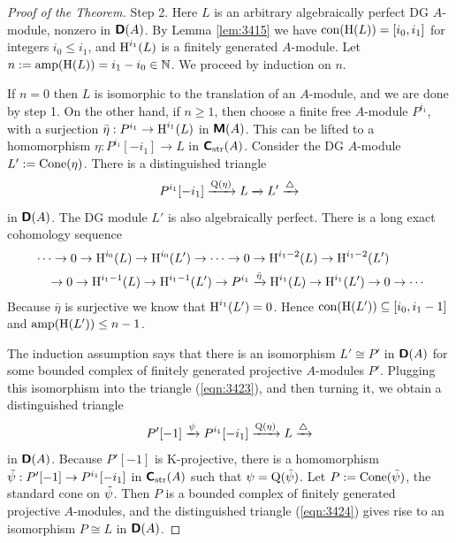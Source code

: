 \begin{proof}[Proof of the Theorem]
\medskip \noindent
Step 2. Here $L$ is an arbitrary algebraically perfect DG $A$-module, nonzero 
in $\boldsymbol{\mathsf{D}}(A)$. By Lemma \ref{lem:3415} we have 
$\operatorname{con}(\operatorname{H}(L)) = [i_0, i_1]$ for integers $i_0 \leq i_1$, and 
$\operatorname{H}^{i_1}(L)$ is a finitely generated $A$-module. 
Let $n := \operatorname{amp}(\operatorname{H}(L)) = i_1 - i_0 \in \mathbb{N}$.
We proceed by induction on $n$. 

If $n = 0$ then $L$ is isomorphic to the translation of an $A$-module, and we 
are done by step 1. On the other hand, if $n \geq 1$, then choose a finite free 
$A$-module $P^{i_1}$, with a surjection 
$\bar{\eta} : P^{i_1} \to \operatorname{H}^{i_1}(L)$ in $\boldsymbol{\mathsf{M}}(A)$. 
This can be lifted to a homomorphism 
$\eta : P^{i_1}[-i_1] \to L$ in $\boldsymbol{\mathsf{C}}_{\mathrm{str}}(A)$. 
Consider the DG $A$-module 
$L' := \operatorname{Cone}(\eta)$.
There is a distinguished triangle 
\begin{equation} \label{eqn:3423}
P^{i_1}[-i_1] \xrightarrow{\operatorname{Q}(\eta)} L \xrightarrow{} L' \xrightarrow{\triangle} 
\end{equation}
in $\boldsymbol{\mathsf{D}}(A)$. 
The DG module $L'$ is also algebraically perfect. There is a long exact 
cohomology sequence 
\[ \begin{aligned}
& \cdots \to 0 \to \operatorname{H}^{i_0}(L) \to \operatorname{H}^{i_0}(L') \to \cdots 
\to 0 \to \operatorname{H}^{i_1 - 2}(L) \to \operatorname{H}^{i_1 - 2}(L')
\\
& \quad 
\to 0 \to \operatorname{H}^{i_1 - 1}(L) \to \operatorname{H}^{i_1 - 1}(L') \to
P^{i_1} \xrightarrow{\bar{\eta}} \operatorname{H}^{i_1}(L) \to \operatorname{H}^{i_1}(L') \to 0 \to \cdots
\end{aligned} \]
Because $\bar{\eta}$ is surjective we know that $\operatorname{H}^{i_1}(L') = 0$.
Hence $\operatorname{con}(\operatorname{H}(L')) \subseteq [i_0, i_1 - 1]$
and $\operatorname{amp}(\operatorname{H}(L')) \leq n - 1$.

The induction assumption says that there is an isomorphism $L' \cong P'$
in $\boldsymbol{\mathsf{D}}(A)$ for some bounded complex of 
finitely generated projective $A$-modules $P'$.
Plugging this isomorphism into the triangle (\ref{eqn:3423}), and then turning 
it, we obtain a distinguished triangle 
\begin{equation} \label{eqn:3424} 
P'[-1] \xrightarrow{\psi} P^{i_1}[-i_1] \xrightarrow{\operatorname{Q}(\eta)} L \xrightarrow{\triangle} 
\end{equation}
in $\boldsymbol{\mathsf{D}}(A)$. Because $P'[-1]$ is K-projective, there is a homomorphism 
$\tilde{\psi} : P'[-1] \to P^{i_1}[-i_1]$ in $\boldsymbol{\mathsf{C}}_{\mathrm{str}}(A)$ such that 
$\psi = \operatorname{Q}(\tilde{\psi})$. Let 
$P := \operatorname{Cone}(\tilde{\psi})$, the standard cone on $\tilde{\psi}$. 
Then $P$ is a bounded complex of finitely generated projective $A$-modules, and 
the distinguished triangle (\ref{eqn:3424}) gives rise to an isomorphism 
$P \cong L$ in $\boldsymbol{\mathsf{D}}(A)$.
\end{proof}

